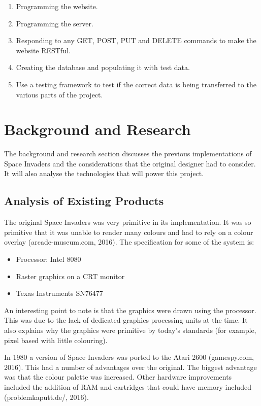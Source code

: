 \documentclass[12pt]{article}
\begin{document}
\begin{enumerate}
\item Programming the website.
\item Programming the server.
\item Responding to any GET, POST, PUT and DELETE commands to make the
website RESTful.
\item Creating the database and populating it with test data.
\item Use a testing framework to test if the correct data is being transferred to the
various parts of the project.
\end{enumerate}
\newpage

\section{Background and Research}
The background and research section discusses the previous implementations of Space Invaders and the considerations that the original designer had to consider. It will also analyse the technologies that will power this project. 

\subsection{Analysis of Existing Products}
The original Space Invaders was very primitive in its implementation. It was so primitive that it was unable to render many colours and had to rely on a colour overlay (arcade-museum.com, 2016). The specification for some of the system is:


\begin{itemize}
	\item Processor: Intel 8080
	\item Raster graphics on a CRT monitor
	\item Texas Instruments SN76477
\end{itemize}

An interesting point to note is that the graphics were drawn using the processor. This was due to the lack of dedicated graphics processing units at the time. It also explains why the graphics were primitive by today's standards (for example, pixel based with little colouring).

In 1980 a version of Space Invaders was ported to the Atari 2600 (gamespy.com, 2016). This had a number of advantages over the original. The biggest advantage was that the colour palette was increased. Other hardware improvements included the addition of RAM and cartridges that could have memory included (problemkaputt.de/, 2016).
\end{document}
